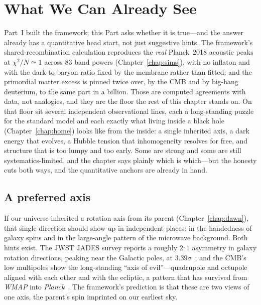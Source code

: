 \chapter{What We Can Already See}
\label{chap:nowobs}

Part~I built the framework; this Part asks whether it is true---and the answer already has a
quantitative head start, not just suggestive hints. The framework's shared-recombination
calculation reproduces the \emph{real} Planck~2018 acoustic peaks at $\chi^2/N\simeq1$ across
$83$ band powers (Chapter~\ref{chap:sims}), with no inflaton and with the dark-to-baryon ratio
fixed by the membrane rather than fitted; and the primordial matter excess is pinned twice over,
by the CMB and by big-bang deuterium, to the same part in a billion. Those are computed
agreements with data, not analogies, and they are the floor the rest of this chapter stands on.
On that floor sit several independent observational lines, each a long-standing puzzle for the
standard model and each exactly what living inside a black hole (Chapter~\ref{chap:home}) looks
like from the inside: a single inherited axis, a dark energy that evolves, a Hubble tension that
inhomogeneity resolves for free, and structure that is too lumpy and too early. Some are strong
and some are still systematics-limited, and the chapter says plainly which is which---but the
honesty cuts both ways, and the quantitative anchors are already in hand.

\section{A preferred axis}
\label{sec:axis}

If our universe inherited a rotation axis from its parent (Chapter~\ref{chap:dawn}),
that single direction should show up in independent places: in the handedness of
galaxy spins and in the large-angle pattern of the microwave background. Both
hints exist. The JWST JADES survey reports a roughly $2\!:\!1$ asymmetry in
galaxy rotation directions, peaking near the Galactic poles, at
$3.39\sigma$~\citep{shamir2025}; and the CMB's low multipoles show the
long-standing ``axis of evil''---quadrupole and octupole aligned with each other
and with the ecliptic, a pattern that has survived from \emph{WMAP} into
\emph{Planck}~\citep{schwarz2016}. The framework's prediction is that these are two views of
one axis, the parent's spin imprinted on our earliest sky.

